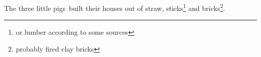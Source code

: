 \documentclass{article}
\begin{document}
\noindent The three little pigs\myfn\ built their houses
out of straw\myfn*, sticks\footnote{or lumber according
to some sources} and bricks\footnote{probably fired clay
bricks}.
\end{document}
